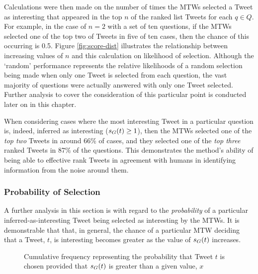 Calculations were then made on the number of times the MTWs selected a Tweet as interesting that appeared in the top $n$ of the ranked list Tweets for each $q \in Q$. For example, in the case of $n=2$ with a set of ten questions, if the MTWs selected one of the top two of Tweets in five of ten cases, then the chance of this occurring is 0.5. Figure \ref{fig:score-dist} illustrates the relationship between increasing values of $n$ and this calculation on likelihood of selection. Although the `random' performance represents the relative likelihoods of a random selection being made when only one Tweet is selected from each question, the vast majority of questions were actually answered with only one Tweet selected. Further analysis to cover the consideration of this particular point is conducted later on in this chapter.


When considering cases where the most interesting Tweet in a particular question is, indeed, inferred as interesting ($s_G(t) \geq 1$), then the MTWs selected one of the \textit{top two} Tweets in around 66\% of cases, and they selected one of the \textit{top three} ranked Tweets in 87\% of the questions. This demonstrates the method's ability of being able to effective rank Tweets in agreement with humans in identifying information from the noise around them.


\subsubsection{Probability of Selection}
A further analysis in this section is with regard to the \textit{probability} of a particular inferred-as-interesting Tweet being selected as interesting by the MTWs. It is demonstrable that that, in general, the chance of a particular MTW deciding that a Tweet, $t$, is interesting becomes greater as the value of $s_G(t)$ increases.

\begin{figure}[h]
\centering
{}
\caption{Cumulative frequency representing the probability that Tweet $t$ is chosen provided that $s_G(t)$ is greater than a given value, $x$}
\label{fig:score-cum-dist}
\end{figure}

